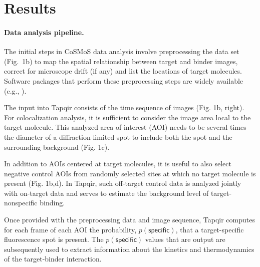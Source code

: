 \section*{Results}
\paragraph{Data analysis pipeline.} %
The initial steps in CoSMoS data analysis involve preprocessing the data set (Fig.~1b) to map the spatial relationship between target and binder images, correct for microscope drift (if any) and list the locations of target molecules. Software packages that perform these preprocessing steps are widely available (e.g.,  \cite{Friedman2015-nx, Smith2019-yb}).

The input into Tapqir consists of the time sequence of images (Fig. 1b, right). For colocalization analysis, it is sufficient to consider the image area local to the target molecule. This analyzed area of interest (AOI) needs to be several times the diameter of a diffraction-limited spot to include both the spot and the surrounding background (Fig. 1c). 

In addition to AOIs centered at target molecules, it is useful to also select negative control AOIs from randomly selected sites at which no target molecule is present (Fig. 1b,d). In Tapqir, such off-target control data is analyzed jointly with on-target data and serves to estimate the background level of target-nonspecific binding. 

Once provided with the preprocessing data and image sequence, Tapqir computes for each frame of each AOI the  probability, $p(\mathsf{specific})$, that a target-specific fluorescence spot is present.   The $p(\mathsf{specific})$ values that are output are subsequently used to extract information about the kinetics and thermodynamics of the target-binder interaction.

